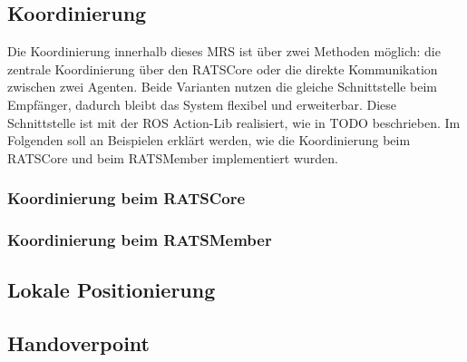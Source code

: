 \subsection{Koordinierung}
Die Koordinierung innerhalb dieses MRS ist über zwei Methoden möglich: die zentrale Koordinierung über den RATSCore oder die direkte Kommunikation zwischen zwei Agenten. Beide Varianten nutzen die gleiche Schnittstelle beim Empfänger, dadurch bleibt das System flexibel und erweiterbar. Diese Schnittstelle ist mit der ROS Action-Lib realisiert, wie in TODO beschrieben. Im Folgenden soll an Beispielen erklärt werden, wie die Koordinierung beim RATSCore und beim RATSMember implementiert wurden.

\subsubsection{Koordinierung beim RATSCore}
\subsubsection{Koordinierung beim RATSMember}
\subsection{Lokale Positionierung}
\label{sec:impl-lopo}
\subsection{Handoverpoint}
\label{sec:impl-hop}
